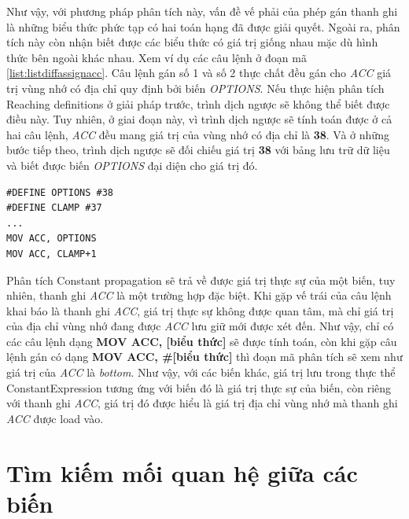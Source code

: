 Như vậy, với phương pháp phân tích này, vấn đề vế phải của phép gán thanh ghi là những biểu thức phức tạp có hai toán hạng đã được giải quyết. Ngoài ra, phân tích này còn nhận biết được các biểu thức có giá trị giống nhau mặc dù hình thức bên ngoài khác nhau. Xem ví dụ các câu lệnh ở đoạn mã \ref{list:listdiffassignacc}. Câu lệnh gán số 1 và số 2 thực chất đều gán cho \textit{ACC} giá trị vùng nhớ có địa chỉ quy định bởi biến \textit{OPTIONS}. Nếu thực hiện phân tích Reaching definitions ở giải pháp trước, trình dịch ngược sẽ không thể biết được điều này. Tuy nhiên, ở giai đoạn này, vì trình dịch ngược sẽ tính toán được ở cả hai câu lệnh, \textit{ACC} đều mang giá trị của vùng nhớ có địa chỉ là \textbf{38}. Và ở những bước tiếp theo, trình dịch ngược sẽ đối chiếu giá trị \textbf{38} với bảng lưu trữ dữ liệu và biết được biến \textit{OPTIONS} đại diện cho giá trị đó.

\begin{lstlisting}[caption={Một số câu lệnh gán cho ACC có giá trị vế phải bằng nhau},label={list:listdiffassignacc}]
#DEFINE OPTIONS #38
#DEFINE CLAMP #37
...
MOV ACC, OPTIONS
MOV ACC, CLAMP+1
\end{lstlisting}

Phân tích Constant propagation sẽ trả về được giá trị thực sự của một biến, tuy nhiên, thanh ghi \textit{ACC} là một trường hợp đặc biệt. Khi gặp vế trái của câu lệnh khai báo là thanh ghi \textit{ACC}, giá trị thực sự không được quan tâm, mà chỉ giá trị của địa chỉ vùng nhớ đang được \textit{ACC} lưu giữ mới được xét đến. Như vậy, chỉ có các câu lệnh dạng \textbf{MOV ACC, [biểu thức]} sẽ được tính toán, còn khi gặp câu lệnh gán có dạng \textbf{MOV ACC, \#[biểu thức]} thì đoạn mã phân tích sẽ xem như giá trị của \textit{ACC} là \textit{bottom}. Như vậy, với các biến khác, giá trị lưu trong thực thể ConstantExpression tương ứng với biến đó là giá trị thực sự của biến, còn riêng với thanh ghi \textit{ACC}, giá trị đó được hiểu là giá trị địa chỉ vùng nhớ mà thanh ghi \textit{ACC} được load vào.
\section{Tìm kiếm mối quan hệ giữa các biến}
